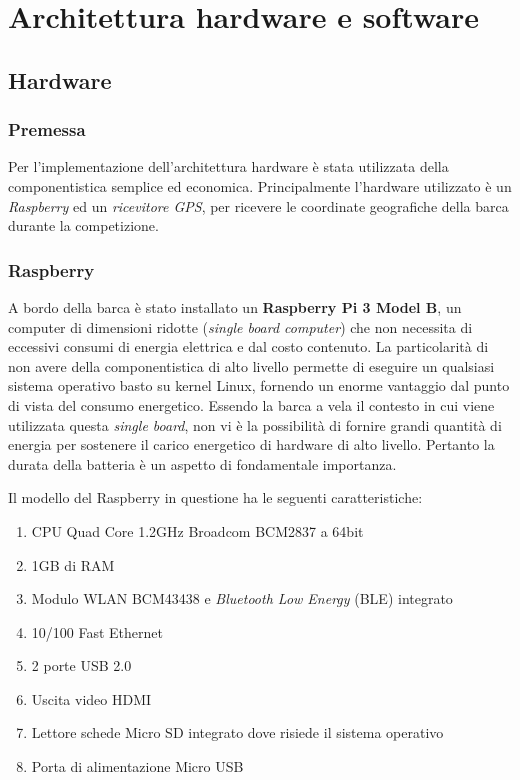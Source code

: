 \chapter{Architettura hardware e software}

\section{Hardware}
\subsection{Premessa}
Per l'implementazione dell'architettura hardware è stata utilizzata della componentistica semplice ed economica. Principalmente l'hardware utilizzato è un \textit{Raspberry} ed un \textit{ricevitore GPS}, per ricevere le coordinate geografiche della barca durante la competizione.

\subsection{Raspberry}
A bordo della barca è stato installato un \textbf{Raspberry Pi 3 Model B}, un computer di dimensioni ridotte (\textit{single board computer}) che non necessita di eccessivi consumi di energia elettrica e dal costo contenuto. La particolarità di non avere della componentistica di alto livello permette di eseguire un qualsiasi sistema operativo basto su kernel Linux, fornendo un enorme vantaggio dal punto di vista del consumo energetico. Essendo la barca a vela il contesto in cui viene utilizzata questa \textit{single board}, non vi è la possibilità di fornire grandi quantità di energia per sostenere il carico energetico di hardware di alto livello. Pertanto la durata della batteria è un aspetto di fondamentale importanza.

\newpage
Il modello del Raspberry in questione ha le seguenti caratteristiche:
\begin{enumerate}
	\item CPU Quad Core 1.2GHz Broadcom BCM2837 a 64bit
	\item 1GB di RAM
	\item Modulo WLAN BCM43438 e \textit{Bluetooth Low Energy} (BLE) integrato
	\item 10/100 Fast Ethernet
	\item 2 porte USB 2.0
	\item Uscita video HDMI
	\item Lettore schede Micro SD integrato dove risiede il sistema operativo
	\item Porta di alimentazione Micro USB
\end{enumerate}

